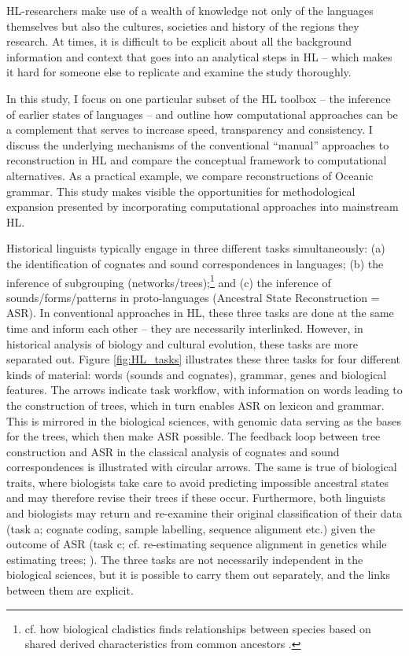 \documentclass[12pt,letterpaper]{article}
\begin{document}
HL-researchers make use of a wealth of knowledge not only of the languages themselves but also the cultures, societies and history of the regions they research. At times, it is difficult to be explicit about all the background information and context that goes into an analytical steps in HL -- which makes it hard for someone else to replicate and examine the study thoroughly.

In this study, I focus on one particular subset of the HL toolbox -- the inference of earlier states of languages -- and outline how computational approaches can be a complement that serves to increase speed, transparency and consistency. I discuss the underlying mechanisms of the conventional ``manual'' approaches to reconstruction in HL and compare the conceptual framework to computational alternatives. As a practical example, we compare reconstructions of Oceanic grammar. This study makes visible the opportunities for methodological expansion presented by incorporating computational approaches into mainstream HL.

Historical linguists typically engage in three different tasks simultaneously: (a) the identification of cognates and sound correspondences in languages; (b) the inference of subgrouping (networks/trees);\footnote{cf. how biological cladistics finds relationships between species based on shared derived characteristics from common ancestors \citep[16--17]{maclaurin2008biodiversity}.} and (c) the inference of sounds/forms/patterns in proto-languages (Ancestral State Reconstruction = ASR). In conventional approaches in HL, these three tasks are done at the same time and inform each other -- they are necessarily interlinked. However, in historical analysis of biology and cultural evolution, these tasks are more separated out. Figure \ref{fig:HL_tasks} illustrates these three tasks for four different kinds of material: words (sounds and cognates), grammar, genes and biological features. The arrows indicate task workflow, with information on words leading to the construction of trees, which in turn enables ASR on lexicon and grammar. This is mirrored in the biological sciences, with genomic data serving as the bases for the trees, which then make ASR possible. The feedback loop between tree construction and ASR in the classical analysis of cognates and sound correspondences is illustrated with circular arrows. The same is true of biological traits, where biologists take care to avoid predicting impossible ancestral states \citep{schulmeister2004comparative} and may therefore revise their trees if these occur. Furthermore, both linguists and biologists may return and re-examine their original classification of their data (task a; cognate coding, sample labelling, sequence alignment etc.) given the outcome of ASR (task c; cf. re-estimating sequence alignment in genetics while estimating trees; \citealt{Redelings_2021_BAli-Phy}). The three tasks are not necessarily independent in the biological sciences, but it is possible to carry them out separately, and the links between them are explicit. 
\end{document}
